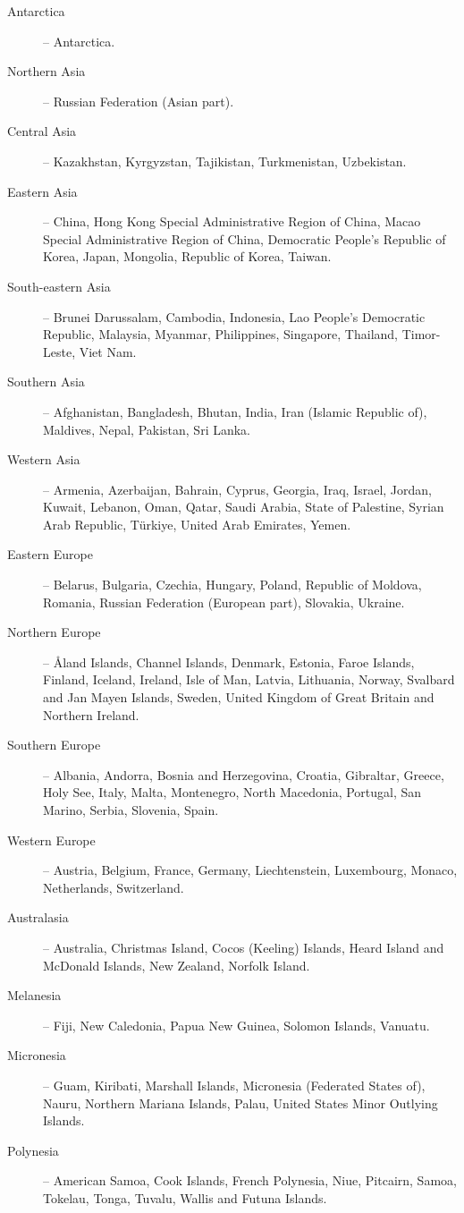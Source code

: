 \begin{description}
	\item[Antarctica] -- Antarctica.
	\item[Northern Asia] -- Russian Federation (Asian part).
	\item[Central Asia] -- Kazakhstan, Kyrgyzstan, Tajikistan, Turkmenistan, Uzbekistan.
	\item[Eastern Asia] -- China, Hong Kong Special Administrative Region of China, Macao Special Administrative Region of China,
          Democratic People's Republic of Korea, Japan, Mongolia, Republic of Korea, Taiwan.
	\item[South-eastern Asia] -- Brunei Darussalam, Cambodia, Indonesia, Lao People's Democratic Republic, Malaysia, Myanmar,
          Philippines, Singapore, Thailand, Timor-Leste, Viet Nam.
	\item[Southern Asia] -- Afghanistan, Bangladesh, Bhutan, India, Iran (Islamic Republic of), Maldives, Nepal, Pakistan, Sri Lanka.
	\item[Western Asia] -- Armenia, Azerbaijan, Bahrain, Cyprus, Georgia, Iraq, Israel, Jordan, Kuwait, Lebanon, Oman, Qatar,
          Saudi Arabia, State of Palestine, Syrian Arab Republic, Türkiye, United Arab Emirates, Yemen.
	\item[Eastern Europe] -- Belarus, Bulgaria, Czechia, Hungary, Poland, Republic of Moldova, Romania, Russian Federation (European part), Slovakia, Ukraine.
	\item[Northern Europe] -- Åland Islands, Channel Islands, Denmark, Estonia, Faroe Islands, Finland, Iceland, Ireland, Isle of Man, Latvia, Lithuania,
          Norway, Svalbard and Jan Mayen Islands, Sweden, United Kingdom of Great Britain and Northern Ireland.
	\item[Southern Europe] -- Albania, Andorra, Bosnia and Herzegovina, Croatia, Gibraltar, Greece, Holy See, Italy, Malta, Montenegro, North Macedonia, Portugal, San Marino, Serbia, Slovenia, Spain.
	\item[Western Europe] -- Austria, Belgium, France, Germany, Liechtenstein, Luxembourg, Monaco, Netherlands, Switzerland.
	\item[Australasia] -- Australia, Christmas Island, Cocos (Keeling) Islands, Heard Island and McDonald Islands, New Zealand, Norfolk Island.
	\item[Melanesia] -- Fiji, New Caledonia, Papua New Guinea, Solomon Islands, Vanuatu.
	\item[Micronesia] -- Guam, Kiribati, Marshall Islands, Micronesia (Federated States of), Nauru, Northern Mariana Islands, Palau, United States Minor Outlying Islands.
	\item[Polynesia] -- American Samoa, Cook Islands, French Polynesia, Niue, Pitcairn, Samoa, Tokelau, Tonga, Tuvalu, Wallis and Futuna Islands.
\end{description}

